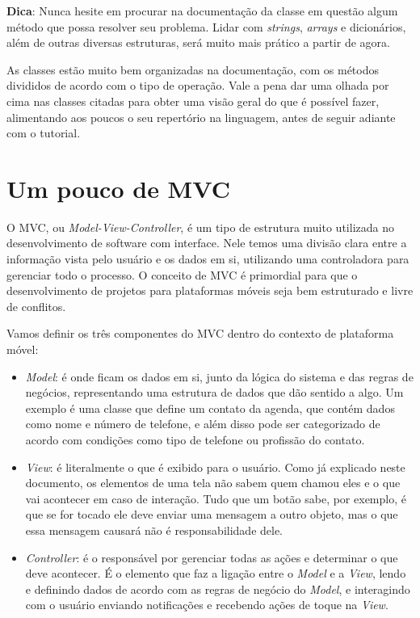 \documentclass[a4paper,12pt,brazil,doubleside]{book}
\begin{document}
\begin{singlespace}
\begin{framed}

\textbf{Dica}: Nunca hesite em procurar na documentação da classe em questão algum método que possa resolver seu problema. Lidar com \textit{strings}, \textit{arrays} e dicionários, além de outras diversas estruturas, será muito mais prático a partir de agora.
\end{framed}


As classes estão muito bem organizadas na documentação, com os métodos divididos de acordo com o tipo de operação. Vale a pena dar uma olhada por cima nas classes citadas para obter uma visão geral do que é possível fazer, alimentando aos poucos o seu repertório na linguagem, antes de seguir adiante com o tutorial.



\section{Um pouco de MVC}

O MVC, ou \emph{Model-View-Controller}, é um tipo de estrutura muito utilizada no desenvolvimento de software com interface. Nele temos uma divisão clara entre a informação vista pelo usuário e os dados em si, utilizando uma controladora para gerenciar todo o processo. O conceito de MVC é primordial para que o desenvolvimento de projetos para plataformas móveis seja bem estruturado e livre de conflitos.

Vamos definir os três componentes do MVC dentro do contexto de plataforma móvel:
\begin{itemize}
\item \emph{Model}: é onde ficam os dados em si, junto da lógica do sistema e das regras de negócios, representando uma estrutura de dados que dão sentido a algo. Um exemplo é uma classe que define um contato da agenda, que contém dados como nome e número de telefone, e além disso pode ser categorizado de acordo com condições como tipo de telefone ou profissão do contato.
\item \emph{View}: é literalmente o que é exibido para o usuário. Como já explicado neste documento, os elementos de uma tela não sabem quem chamou eles e o que vai acontecer em caso de interação. Tudo que um botão sabe, por exemplo, é que se for tocado ele deve enviar uma mensagem a outro objeto, mas o que essa mensagem causará não é responsabilidade dele.
\item \emph{Controller}: é o responsável por gerenciar todas as ações e determinar o que deve acontecer. É o elemento que faz a ligação entre o \emph{Model} e a \emph{View}, lendo e definindo dados de acordo com as regras de negócio do \emph{Model}, e interagindo com o usuário enviando notificações e recebendo ações de toque na \emph{View}.
\end{itemize}


\end{singlespace}
\end{document}
